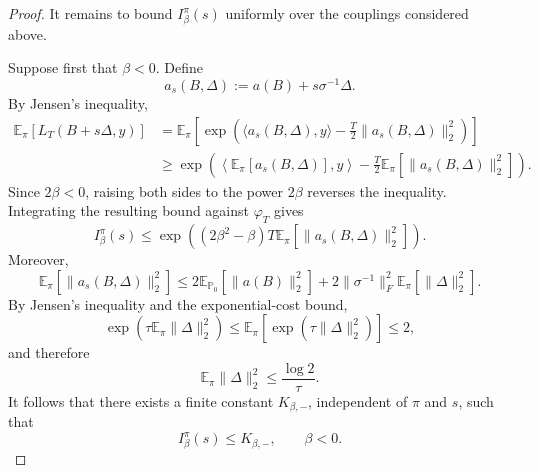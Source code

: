 \documentclass[10pt,a4paper]{amsart}
\newcommand{\E}{\mathbb{E}}
\begin{document}
\begin{proof}
It remains to bound $I_\beta^\pi(s)$ uniformly over the couplings
considered above.

Suppose first that $\beta<0$. Define
\[
a_s(B,\Delta)
:=
a(B)+s\sigma^{-1}\Delta.
\]
By Jensen's inequality,
\begin{align*}
\E_\pi[L_T(B+s\Delta,y)]
&=
\E_\pi
\left[
\exp\!\left(
\langle a_s(B,\Delta),y\rangle
-
\frac{T}{2}\|a_s(B,\Delta)\|_2^2
\right)
\right] \\
&\geq
\exp\!\left(
\left\langle
\E_\pi[a_s(B,\Delta)],y
\right\rangle
-
\frac{T}{2}
\E_\pi
\left[
\|a_s(B,\Delta)\|_2^2
\right]
\right).
\end{align*}
Since $2\beta<0$, raising both sides to the power $2\beta$ reverses the
inequality. Integrating the resulting bound against $\varphi_T$ gives
\[
I_\beta^\pi(s)
\leq
\exp\!\left(
(2\beta^2-\beta)T
\E_\pi
\left[
\|a_s(B,\Delta)\|_2^2
\right]
\right).
\]
Moreover,
\[
\E_\pi
\left[
\|a_s(B,\Delta)\|_2^2
\right]
\leq
2\E_{\mathbb P_0}
\left[
\|a(B)\|_2^2
\right]
+
2\|\sigma^{-1}\|_F^2
\E_\pi
\left[
\|\Delta\|_2^2
\right].
\]
By Jensen's inequality and the exponential-cost bound,
\[
\exp\!\left(
\tau\E_\pi\|\Delta\|_2^2
\right)
\leq
\E_\pi
\left[
\exp\!\left(
\tau\|\Delta\|_2^2
\right)
\right]
\leq 2,
\]
and therefore
\[
\E_\pi\|\Delta\|_2^2
\leq
\frac{\log 2}{\tau}.
\]
It follows that there exists a finite constant $K_{\beta,-}$,
independent of $\pi$ and $s$, such that
\begin{equation}\label{eq:Ibeta-negative-uniform}
I_\beta^\pi(s)
\leq
K_{\beta,-},
\qquad
\beta<0.
\end{equation}


\end{proof}
\end{document}
